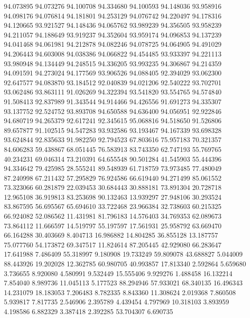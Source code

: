 94.073895
94.073276
94.100708
94.334680
94.100593
94.148036
93.958916
94.098176
94.076814
94.181801
94.253129
94.076742
94.220497
94.178316
94.120665
93.921527
94.148436
94.065762
93.989239
94.356505
93.958239
94.211057
94.188649
93.919237
94.352604
93.959174
94.096853
94.137239
94.041468
94.061981
94.212878
94.082246
94.078725
94.064905
94.491029
94.206443
94.603008
94.038386
94.066822
94.454485
93.933397
94.221113
93.980948
94.134449
94.248515
94.336205
93.993235
94.306867
94.214359
94.091591
94.273024
94.177569
93.906526
94.088405
92.394029
93.062300
92.647577
94.083870
93.184512
92.040839
94.021206
92.540222
93.702701
93.062486
93.863111
91.026269
94.322394
93.541820
93.554765
94.574840
91.508413
92.837989
91.343544
94.914466
94.426556
91.691273
94.335307
93.137752
92.524752
93.893708
94.650588
94.636400
94.056951
92.922846
94.680719
94.265379
92.617241
92.345615
95.068816
94.518650
91.526806
89.657877
91.102515
94.547283
93.932586
93.193467
94.167339
93.698328
93.624844
92.835633
91.982250
92.794523
67.803616
75.957183
70.321357
84.606283
59.438867
68.051445
76.583913
83.743350
62.747193
55.769765
40.234231
69.046314
73.210391
64.655548
90.501284
41.545903
55.444396
94.334642
79.425985
28.555241
89.548939
61.718759
73.973485
77.480049
87.240998
67.211432
57.295829
76.924586
66.619440
94.271499
85.061552
73.323066
60.281879
22.039453
30.684443
30.888181
73.891304
20.728718
12.965108
36.919813
83.253698
90.132463
13.939297
27.948106
30.293524
83.867595
56.695567
65.694610
33.722468
23.966384
32.738603
60.215325
66.924082
52.086562
11.431981
81.796183
14.576403
34.769353
62.089673
73.864112
11.666597
14.519797
55.197597
17.561931
25.958792
63.669470
66.164288
30.403669
8.404713
16.986882
14.804285
36.855128
13.187757
75.077760
54.173872
69.347517
11.824614
87.205445
42.929080
66.283647
17.641988
7.486409
55.318997
9.180908
19.733249
59.809078
43.688827
5.044009
88.443926
19.202028
12.362785
60.980705
40.993857
17.813340
2.592864
5.659680
3.736655
8.920080
4.580991
9.532449
15.555406
9.929276
1.488458
16.132214
7.854040
8.989736
11.045113
5.177523
88.294946
57.933021
68.340135
16.496343
14.231079
18.183053
7.206483
8.782335
8.843360
11.308624
2.019368
7.860508
5.939817
7.817735
2.546906
2.395789
4.439454
4.797969
10.318103
3.893959
4.198586
6.882329
3.387418
2.392285
53.704307
6.690735
